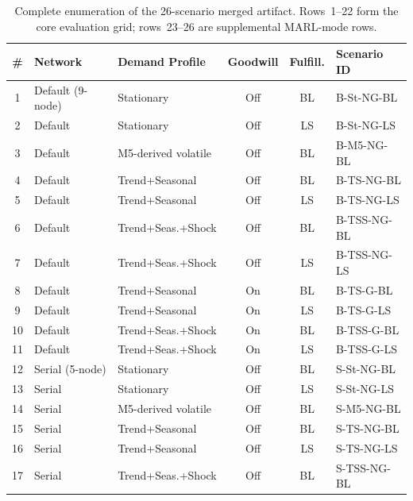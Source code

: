 \documentclass[10pt,a4paper]{article}
\begin{document}
\begin{table}[!tbp]
\centering
\caption{Complete enumeration of the 26-scenario merged artifact. Rows~1--22
form the core evaluation grid; rows~23--26 are supplemental MARL-mode rows.}
\label{tab:full_scenarios}
\label{tab:supplemental_marl_scenarios}
\scriptsize
\renewcommand{\arraystretch}{1.06}
\begin{tabular}{@{} c l l c c l @{}}
\toprule
\textbf{\#}
  & \textbf{Network}
  & \textbf{Demand Profile}
  & \textbf{Goodwill}
  & \textbf{Fulfill.}
  & \textbf{Scenario ID} \\
\midrule
\rowcolor{lightgray}
1  & Default (9-node) & Stationary          & Off & BL & B-St-NG-BL  \\
2  & Default          & Stationary          & Off & LS & B-St-NG-LS  \\
\rowcolor{lightgray}
3  & Default          & M5-derived volatile & Off & BL & B-M5-NG-BL  \\
4  & Default          & Trend+Seasonal      & Off & BL & B-TS-NG-BL  \\
\rowcolor{lightgray}
5  & Default          & Trend+Seasonal      & Off & LS & B-TS-NG-LS  \\
6  & Default          & Trend+Seas.+Shock   & Off & BL & B-TSS-NG-BL \\
\rowcolor{lightgray}
7  & Default          & Trend+Seas.+Shock   & Off & LS & B-TSS-NG-LS \\
8  & Default          & Trend+Seasonal      & On  & BL & B-TS-G-BL   \\
\rowcolor{lightgray}
9  & Default          & Trend+Seasonal      & On  & LS & B-TS-G-LS   \\
10 & Default          & Trend+Seas.+Shock   & On  & BL & B-TSS-G-BL  \\
\rowcolor{lightgray}
11 & Default          & Trend+Seas.+Shock   & On  & LS & B-TSS-G-LS  \\
\midrule
12 & Serial (5-node)  & Stationary          & Off & BL & S-St-NG-BL  \\
\rowcolor{lightgray}
13 & Serial           & Stationary          & Off & LS & S-St-NG-LS  \\
14 & Serial           & M5-derived volatile & Off & BL & S-M5-NG-BL  \\
\rowcolor{lightgray}
15 & Serial           & Trend+Seasonal      & Off & BL & S-TS-NG-BL  \\
16 & Serial           & Trend+Seasonal      & Off & LS & S-TS-NG-LS  \\
\rowcolor{lightgray}
17 & Serial           & Trend+Seas.+Shock   & Off & BL & S-TSS-NG-BL \\

\end{tabular}
\end{table}
\end{document}
